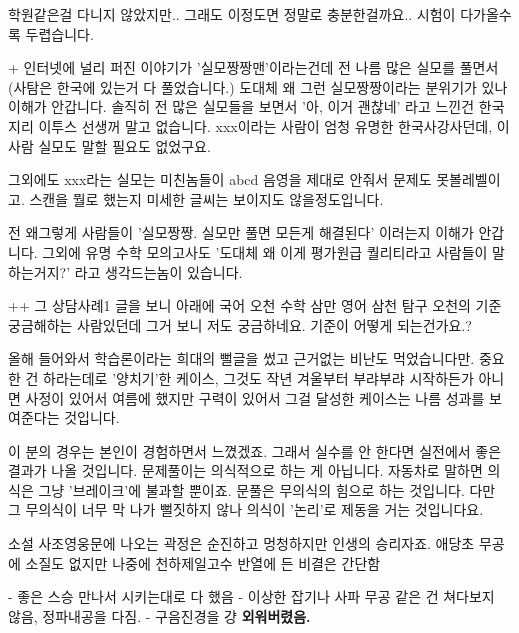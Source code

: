     학원같은걸 다니지 않았지만.. 그래도 이정도면 정말로 충분한걸까요.. 시험이 다가올수록 두렵습니다.
    \vspace{5mm}

    + 인터넷에 널리 퍼진 이야기가 '실모짱짱맨'이라는건데 전 나름 많은 실모를 풀면서 (사탐은 한국에 있는거 다 풀었습니다.) 도대체 왜 그런 실모짱짱이라는 분위기가 있나 이해가 안갑니다. 솔직히 전 많은 실모들을 보면서 '아, 이거 괜찮네' 라고 느낀건 한국지리 이투스 선생꺼 말고 없습니다. xxx이라는 사람이 엄청 유명한 한국사강사던데, 이사람 실모도 말할 필요도 없었구요.
    \vspace{5mm}

    그외에도 xxx라는 실모는 미친놈들이 abcd 음영을 제대로 안줘서 문제도 못볼레벨이고. 스캔을 뭘로 했는지 미세한 글씨는 보이지도 않을정도입니다.
    \vspace{5mm}

    전 왜그렇게 사람들이 '실모짱짱. 실모만 풀면 모든게 해결된다' 이러는지 이해가 안갑니다.  그외에 유명 수학 모의고사도 '도대체 왜 이게 평가원급 퀄리티라고 사람들이 말하는거지?' 라고 생각드는놈이 있습니다.
    \vspace{5mm}





++ 그 상담사례1 글을 보니 아래에 국어 오천 수학 삼만 영어 삼천 탐구 오천의 기준 궁금해하는 사람있던데 그거 보니 저도 궁금하네요. 기준이 어떻게 되는건가요.?
\vspace{5mm}

올해 들어와서 학습론이라는 희대의 뻘글을 썼고 근거없는 비난도 먹었습니다만.
중요한 건 하라는데로 '양치기'한 케이스, 그것도 작년 겨울부터 부랴부랴 시작하든가
아니면 사정이 있어서 여름에 했지만 구력이 있어서 그걸 달성한 케이스는 나름 성과를 보여준다는 것입니다.
\vspace{5mm}

이 분의 경우는 본인이 경험하면서 느꼈겠죠. 그래서 실수를 안 한다면 실전에서 좋은 결과가 나올 것입니다.
문제풀이는 의식적으로 하는 게 아닙니다. 자동차로 말하면 의식은 그냥 '브레이크'에 불과할 뿐이죠.
문풀은 무의식의 힘으로 하는 것입니다. 다만 그 무의식이 너무 막 나가 뻘짓하지 않나 의식이 '논리'로 제동을 거는 것입니다요.
\vspace{5mm}

소설 사조영웅문에 나오는 곽정은 순진하고 멍청하지만 인생의 승리자죠.
애당초 무공에 소질도 없지만 나중에 천하제일고수 반열에 든 비결은 간단함
\vspace{5mm}

- 좋은 스승 만나서 시키는대로 다 했음
- 이상한 잡기나 사파 무공 같은 건 쳐다보지 않음, 정파내공을 다짐.
- 구음진경을 걍 \textbf{외워버렸음.}
\vspace{5mm}

